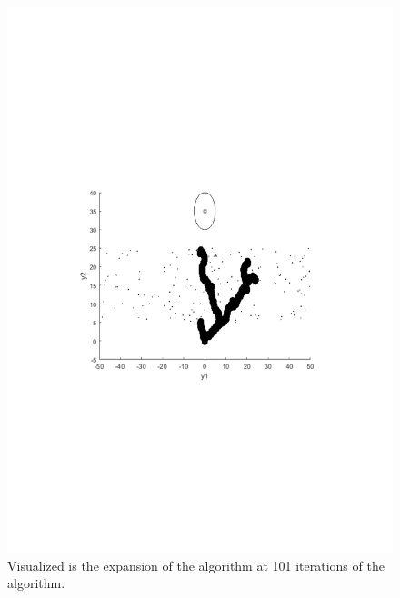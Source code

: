 \begin{figure}[!t]
\begin{minipage}[c]{.9\columnwidth}
  \includegraphics[scale=.5, trim={5cm, 9cm, 5cm, 7cm}, clip]{figures/experiments/rrtfunnel-101samples.pdf}
  \caption[The expansion of the \rrtfunnel algorithm at 1, and 101 iterations]{Visualized is the expansion of the \rrtfunnel algorithm at 101 iterations of the algorithm.}
  \end{minipage}
\end{figure}

